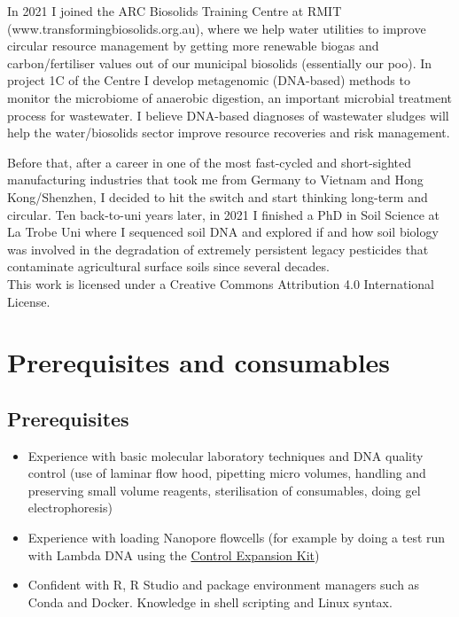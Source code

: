\documentclass[
]{book}
\providecommand{\tightlist}{%
  \setlength{\itemsep}{0pt}\setlength{\parskip}{0pt}}
\begin{document}
In 2021 I joined the ARC Biosolids Training Centre at RMIT (www.transformingbiosolids.org.au), where we help water utilities to improve circular resource management by getting more renewable biogas and carbon/fertiliser values out of our municipal biosolids (essentially our poo). In project 1C of the Centre I develop metagenomic (DNA-based) methods to monitor the microbiome of anaerobic digestion, an important microbial treatment process for wastewater. I believe DNA-based diagnoses of wastewater sludges will help the water/biosolids sector improve resource recoveries and risk management.

Before that, after a career in one of the most fast-cycled and short-sighted manufacturing industries that took me from Germany to Vietnam and Hong Kong/Shenzhen, I decided to hit the switch and start thinking long-term and circular. Ten back-to-uni years later, in 2021 I finished a PhD in Soil Science at La Trobe Uni where I sequenced soil DNA and explored if and how soil biology was involved in the degradation of extremely persistent legacy pesticides that contaminate agricultural surface soils since several decades.\\

This work is licensed under a Creative Commons Attribution 4.0 International License.

\chapter{Prerequisites and consumables}\label{prerequisites}

\section{Prerequisites}\label{prerequisites-1}

\begin{itemize}
\tightlist
\item
  Experience with basic molecular laboratory techniques and DNA quality control (use of laminar flow hood, pipetting micro volumes, handling and preserving small volume reagents, sterilisation of consumables, doing gel electrophoresis)
\item
  Experience with loading Nanopore flowcells (for example by doing a test run with Lambda DNA using the \href{https://store.nanoporetech.com/control-expansion.html}{Control Expansion Kit})\\
\item
  Confident with R, R Studio and package environment managers such as Conda and Docker. Knowledge in shell scripting and Linux syntax.
\end{itemize}
\end{document}

